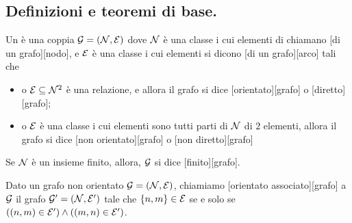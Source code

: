 \subsection{Definizioni e teoremi di base.}
\label{DefinizioniETeoremiDiBaseGrafi}
\begin{Definition}
	Un  \`e una coppia
  $\mathcal{G} = (\mathcal{N},\mathcal{E})$ dove $\mathcal{N}$ \`e
  una classe i cui elementi di chiamano
  [di un grafo][nodo],
  e $\mathcal{E}$ \`e una classe i cui elementi si dicono
  [di un grafo][arco] tali che
	\begin{itemize}
		\item o $\mathcal{E} \subseteq \mathcal{N}^2$ \`e una relazione, e allora il
      grafo si dice [orientato][grafo] o
     [diretto][grafo];
		\item o $\mathcal{E}$ \`e una classe i cui elementi sono tutti parti di
      $\mathcal{N}$ di $2$ elementi, allora il grafo si
      dice [non orientato][grafo] o
      [non diretto][grafo]
	\end{itemize}
  Se $\mathcal{N}$ \`e un insieme finito, allora, $\mathcal{G}$ si dice
  [finito][grafo].
\end{Definition}
\begin{Definition}
  Dato un grafo non orientato $\mathcal{G} = (\mathcal{N},\mathcal{E})$, chiamiamo
  [orientato associato][grafo]
  a $\mathcal{G}$ il grafo $\mathcal{G}' = (\mathcal{N},\mathcal{E}')$ tale che
  $\lbrace n, m \rbrace \in \mathcal{E}$ se e solo se
  $\left ( (n,m) \in \mathcal{E}' \right ) \wedge \left ( (m,n) \in \mathcal{E}' \right )$.
\end{Definition}

